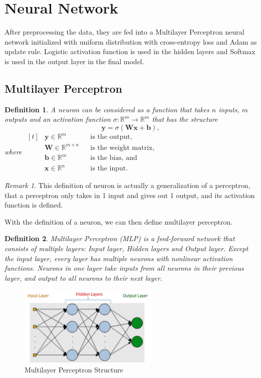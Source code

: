 \documentclass[12pt]{article}
\newtheorem{definition}{Definition}
\theoremstyle{remark}
\newtheorem*{remark}{Remark}
\newcommand{\R}{\mathbb{R}}
\newcommand{\mat}[1]{\mathbf{#1}}
\begin{document}
\section{Neural Network}
After preprocessing the data, they are fed into a Multilayer Perceptron neural network initialized with uniform distribution with cross-entropy loss and Adam as update rule. Logistic activation function is used in the hidden layers and Softmax is used in the output layer in the final model.

\subsection{Multilayer Perceptron}
\begin{definition}
	A neuron can be considered as a function that takes \(n\) inputs, \(m\) outputs and an activation function \(\sigma: \R^m \to \R^m\) that has the structure
	\[
		\mat y = \sigma(\mat W \mat x + \mat b),
	\]
	where
	\(\begin{aligned}[t]
		 & \mat y \in \R^m            &  & \text{is the output,}        \\
		 & \mat W \in \R^{m \times n} &  & \text{is the weight matrix,} \\
		 & \mat b \in \R^m            &  & \text{is the bias, and}      \\
		 & \mat x \in \R^n            &  & \text{is the input}.
	\end{aligned}\)
\end{definition}
\begin{remark}
	This definition of neuron is actually a generalization of a perceptron, that a perceptron only takes in 1 input and gives out 1 output, and its activation function is defined.
\end{remark}
\noindent With the definition of a neuron, we can then define multilayer perceptron.
\begin{definition}
	Multilayer Perceptron (MLP) is a feed-forward network that consists of multiple layers: Input layer, Hidden layers and Output layer. Except the input layer, every layer has multiple neurons with nonlinear activation functions. Neurons in one layer take inputs from all neurons in their previous layer, and output to all neurons to their next layer.
\end{definition}
\begin{figure}[!h]\label{fig:mlp}
	\includegraphics[width=0.6\textwidth]{mlp}
	\centering
	\caption{Multilayer Perceptron Structure}
\end{figure}
\end{document}

